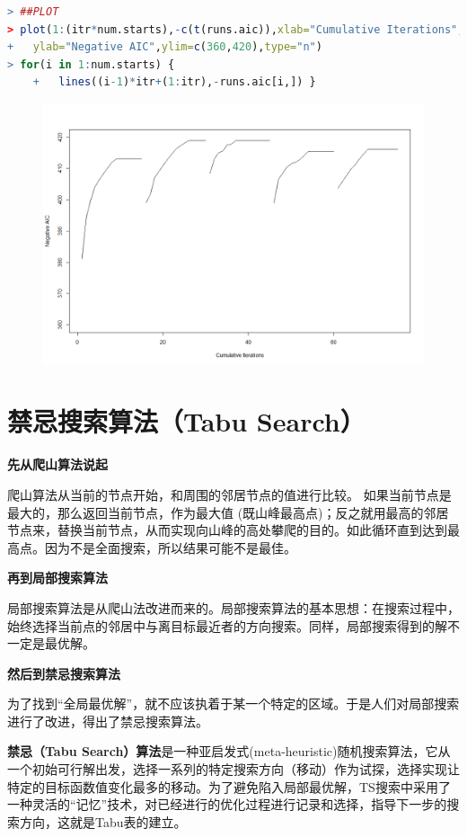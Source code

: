 \documentclass[11pt,a4paper,oneside]{book}
\begin{document}
\begin{lstlisting}[language=r]
> ##PLOT
> plot(1:(itr*num.starts),-c(t(runs.aic)),xlab="Cumulative Iterations",
+   ylab="Negative AIC",ylim=c(360,420),type="n")
> for(i in 1:num.starts) {
	+   lines((i-1)*itr+(1:itr),-runs.aic[i,]) }
\end{lstlisting}
\begin{figure}[H]
	\centering
	\includegraphics[width=\textwidth]{6.png}
\end{figure}

\section{禁忌搜索算法（Tabu  Search）}
\textbf{先从爬山算法说起}

爬山算法从当前的节点开始，和周围的邻居节点的值进行比较。 如果当前节点是最大的，那么返回当前节点，作为最大值 (既山峰最高点)；反之就用最高的邻居节点来，替换当前节点，从而实现向山峰的高处攀爬的目的。如此循环直到达到最高点。因为不是全面搜索，所以结果可能不是最佳。

\textbf{再到局部搜索算法}

局部搜索算法是从爬山法改进而来的。局部搜索算法的基本思想：在搜索过程中，始终选择当前点的邻居中与离目标最近者的方向搜索。同样，局部搜索得到的解不一定是最优解。

\textbf{然后到禁忌搜索算法}

为了找到“全局最优解”，就不应该执着于某一个特定的区域。于是人们对局部搜索进行了改进，得出了禁忌搜索算法。

\textbf{禁忌（Tabu Search）算法}是一种亚启发式(meta-heuristic)随机搜索算法，它从一个初始可行解出发，选择一系列的特定搜索方向（移动）作为试探，选择实现让特定的目标函数值变化最多的移动。为了避免陷入局部最优解，TS搜索中采用了一种灵活的“记忆”技术，对已经进行的优化过程进行记录和选择，指导下一步的搜索方向，这就是Tabu表的建立。
\end{document}
